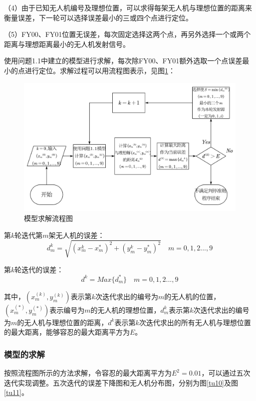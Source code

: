 \documentclass[12pt]{ctexart}
\begin{document}
\begin{spacing}{1.5}
（4）由于已知无人机编号及理想位置，可以求得每架无人机与理想位置的距离来衡量误差，下一轮可以选择误差最小的三或四个点进行定位。

（5）FY00、FY01位置无误差，每次固定选择这两个点，再另外选择一个或两个距离与理想距离最小的无人机发射信号。

使用问题1.1中建立的模型进行求解，每次除FY00、FY01额外选取一个点误差最小的点进行定位。求解过程可以用流程图表示，见图\ref{tu9}：
\begin{figure}[H]
\centering
\includegraphics[width=1.0\textwidth]{1.3模型求解流程图.png}
\caption{模型求解流程图}
\label{tu9}
\end{figure}

第$k$轮迭代第$m$架无人机的误差：
\begin{equation}
	d_m^{k}=\sqrt{(x_m^{k}-x_m^{*})^2+(y_m^{k}-y_m^{*})^2} \quad m=0,1,2...,9
\end{equation}

第$k$轮迭代的误差：
\begin{equation}
	d^{k}=Max\{d_m^{*}\} \quad m=0,1,2...,9
\end{equation}

其中，$(x_m^{(k)},y_m^{(k)})$表示第$k$次迭代求出的编号为$m$的无人机的位置，$(x_m^{(*)},y_m^{(*)})$表示编号为$m$的无人机的理想位置，$d_m^{k}$表示第$k$次迭代求出的编号为$m$的无人机与理想位置的距离，$d^{k}$表示第$k$次迭代求出的所有无人机与理想位置的最大距离，能够容忍的最大距离平方为$E$。

\subsubsection{模型的求解}
按照流程图所示的方法求解，令容忍的最大距离平方为$E^2=0.01$，可以通过五次迭代实现调整。五次迭代的误差下降图和无人机分布图，分别为图\ref{tu10}及图\ref{tu11}。


\end{spacing}
\end{document}
